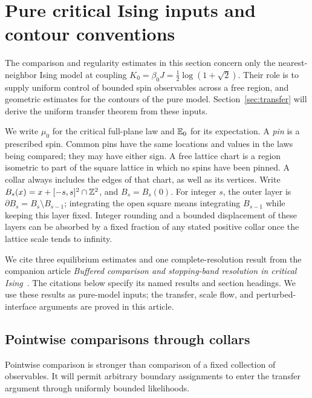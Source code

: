 \section{Pure critical Ising inputs and contour conventions}
\label{sec:pure}

The comparison and regularity estimates in this section concern only the
nearest-neighbor Ising model at coupling
\(K_0=\beta_0J=\frac12\log(1+\sqrt2)\). Their role is to supply uniform
control of bounded spin observables across a free region, and geometric
estimates for the contours of the pure model. Section~\ref{sec:transfer}
will derive the uniform transfer theorem from these inputs.

We write \(\mu_0\) for the critical full-plane law and \(\mathbb E_0\) for its
expectation. A \emph{pin} is a prescribed spin. Common pins have the same
locations and values in the laws being compared; they may have either
sign. A free lattice chart is a region isometric to part of the square
lattice in which no spins have been pinned. A collar always includes
the edges of that chart, as well as its vertices. Write
\(B_s(x)=x+[-s,s]^2\cap\mathbb Z^2\), and \(B_s=B_s(0)\). For integer \(s\),
the outer layer is \(\partial B_s=B_s\setminus B_{s-1}\); integrating
the open square means integrating \(B_{s-1}\) while keeping this layer
fixed. Integer rounding and a bounded displacement of these layers can
be absorbed by a fixed fraction of any stated positive collar once the
lattice scale tends to infinity.

We cite three equilibrium estimates and one complete-resolution result
from the companion article \emph{Buffered comparison and stopping-band
resolution in critical Ising}~\cite{OpenAIStatic2026}. The citations
below specify its named results and section headings. We use these
results as pure-model inputs; the
transfer, scale flow, and perturbed-interface arguments are proved in
this article.

\subsection{Pointwise comparisons through collars}

Pointwise comparison is stronger than comparison of a fixed collection
of observables. It will permit arbitrary boundary assignments to enter
the transfer argument through uniformly bounded likelihoods.

